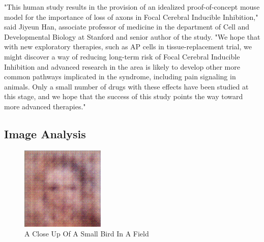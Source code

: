 \documentclass{article}%
\begin{document}
"This human study results in the provision of an idealized proof{-}of{-}concept mouse model for the importance of loss of axons in Focal Cerebral Inducible Inhibition," said Jiyeun Han, associate professor of medicine in the department of Cell and Developmental Biology at Stanford and senior author of the study. "We hope that with new exploratory therapies, such as AP cells in tissue{-}replacement trial, we might discover a way of reducing long{-}term risk of Focal Cerebral Inducible Inhibition and advanced research in the area is likely to develop other more common pathways implicated in the syndrome, including pain signaling in animals. Only a small number of drugs with these effects have been studied at this stage, and we hope that the success of this study points the way toward more advanced therapies."

%
\subsection{Image Analysis}%
\label{subsec:ImageAnalysis}%


\begin{figure}[h!]%
\centering%
\includegraphics[width=150px]{500_fake_images/samples_5_384.png}%
\caption{A Close Up Of A Small Bird In A Field}%
\end{figure}

%
\end{document}
